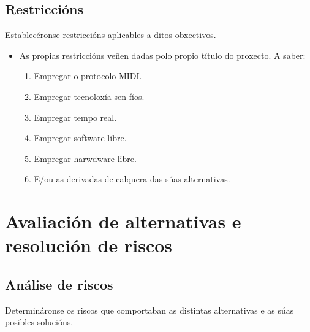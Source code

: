  \subsection{Restriccións}

 Establecéronse restriccións aplicables a ditos obxectivos.

 \begin{itemize}
  \item As propias restriccións veñen dadas polo propio título do proxecto. A
        saber:
        \begin{enumerate}
         \item Empregar o protocolo MIDI.
         \item Empregar tecnoloxía sen fíos.
         \item Empregar tempo real.
         \item Empregar software libre.
         \item Empregar harwdware libre.
         \item E/ou as derivadas de calquera das súas alternativas.
        \end{enumerate}
 \end{itemize}

\section{Avaliación de alternativas e resolución de riscos}

 \subsection{Análise de riscos}

 Determináronse os riscos que comportaban as distintas alternativas e as súas
 posibles solucións.

